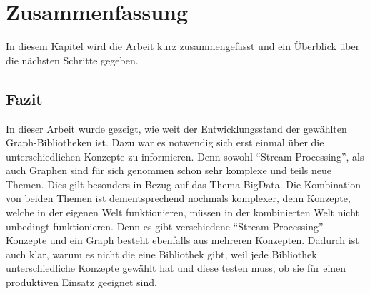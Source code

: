 \chapter{Zusammenfassung}
In diesem Kapitel wird die Arbeit kurz zusammengefasst und ein Überblick über
die nächsten Schritte gegeben.

\section{Fazit}
In dieser Arbeit wurde gezeigt, wie weit der Entwicklungsstand der gewählten
Graph-Bibliotheken ist. Dazu war es notwendig sich erst einmal über die
unterschiedlichen Konzepte zu informieren. Denn sowohl \enquote{Stream-Processing},
als auch Graphen sind für sich genommen schon sehr komplexe und teils neue Themen.
Dies gilt besonders in Bezug auf das Thema \gls{BigData}. Die Kombination von
beiden Themen ist dementsprechend nochmals komplexer, denn Konzepte, welche in
der eigenen Welt funktionieren, müssen in der kombinierten Welt nicht unbedingt
funktionieren. Denn es gibt verschiedene \enquote{Stream-Processing} Konzepte und
ein Graph besteht ebenfalls aus mehreren Konzepten. Dadurch ist auch klar, warum
es nicht die eine Bibliothek gibt, weil jede Bibliothek unterschiedliche Konzepte
gewählt hat und diese testen muss, ob sie für einen produktiven Einsatz geeignet
sind.

